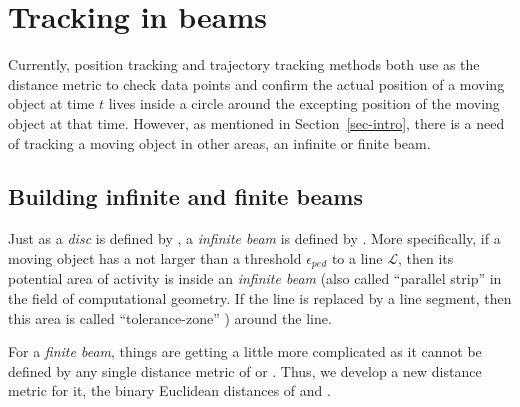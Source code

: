 

\section{Tracking in beams}
\label{sec:rectangle}
Currently, position tracking and trajectory tracking methods both use \sed as the distance metric to check data points and confirm the actual position of a moving object at time $t$ lives inside a circle around the excepting position of the moving object at that time.
{However, as mentioned in Section~\ref{sec-intro}, there is a need of tracking a moving object in other areas, \eg an infinite or finite beam.}
%

\subsection{Building infinite and finite beams}

Just as a \emph{disc} is defined by \sed, a \emph{infinite beam} is defined by \ped. More specifically, if a moving object has a \ped not larger than a threshold $\epsilon_{ped}$ to a line $\mathcal{L}$, then its potential area of activity is inside an \emph{infinite beam} (also called ``parallel strip'' \cite{Chen:Space,Daescu:metric} in the field of computational geometry. If the line is replaced by a line segment, then this area is called ``tolerance-zone'' \cite{Imai:Optimal}) around the line.

For a \emph{finite beam}, things are getting a little more complicated as it cannot be defined by any single distance metric of \ped or \sed. 
Thus, we develop a new distance metric for it, \ie the binary Euclidean distances of \sed and \ped.



